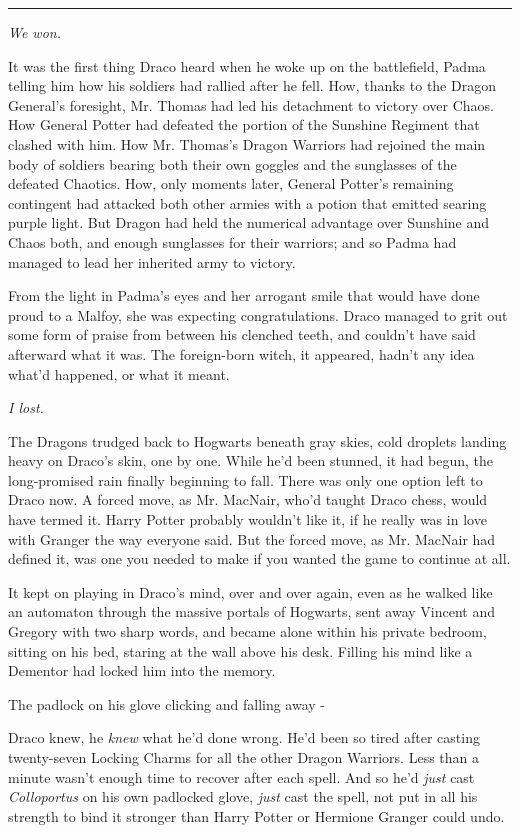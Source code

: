 \begin{center}\rule{3in}{0.4pt}\end{center}

\emph{We won.}

It was the first thing Draco heard when he woke up on the battlefield, Padma telling him how his soldiers had rallied after he fell. How, thanks to the Dragon General's foresight, Mr. Thomas had led his detachment to victory over Chaos. How General Potter had defeated the portion of the Sunshine Regiment that clashed with him. How Mr. Thomas's Dragon Warriors had rejoined the main body of soldiers bearing both their own goggles and the sunglasses of the defeated Chaotics. How, only moments later, General Potter's remaining contingent had attacked both other armies with a potion that emitted searing purple light. But Dragon had held the numerical advantage over Sunshine and Chaos both, and enough sunglasses for their warriors; and so Padma had managed to lead her inherited army to victory.

From the light in Padma's eyes and her arrogant smile that would have done proud to a Malfoy, she was expecting congratulations. Draco managed to grit out some form of praise from between his clenched teeth, and couldn't have said afterward what it was. The foreign-born witch, it appeared, hadn't any idea what'd happened, or what it meant.

\emph{I lost.}

The Dragons trudged back to Hogwarts beneath gray skies, cold droplets landing heavy on Draco's skin, one by one. While he'd been stunned, it had begun, the long-promised rain finally beginning to fall. There was only one option left to Draco now. A forced move, as Mr. MacNair, who'd taught Draco chess, would have termed it. Harry Potter probably wouldn't like it, if he really was in love with Granger the way everyone said. But the forced move, as Mr. MacNair had defined it, was one you needed to make if you wanted the game to continue at all.

It kept on playing in Draco's mind, over and over again, even as he walked like an automaton through the massive portals of Hogwarts, sent away Vincent and Gregory with two sharp words, and became alone within his private bedroom, sitting on his bed, staring at the wall above his desk. Filling his mind like a Dementor had locked him into the memory.

The padlock on his glove clicking and falling away -

Draco knew, he \emph{knew} what he'd done wrong. He'd been so tired after casting twenty-seven Locking Charms for all the other Dragon Warriors. Less than a minute wasn't enough time to recover after each spell. And so he'd \emph{just} cast \emph{Colloportus} on his own padlocked glove, \emph{just} cast the spell, not put in all his strength to bind it stronger than Harry Potter or Hermione Granger could undo.

